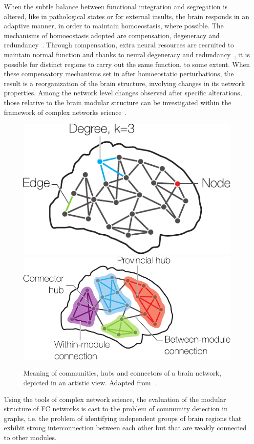 When the subtle balance between functional integration and segregation is altered, like in pathological states or for external insults, the brain responds in an adaptive manner, in order to maintain homoeostasis, where possible. The mechanisms of homoeostasis adopted are compensation, degeneracy and redundancy~\cite{fornito2015}.
Through compensation, extra neural resources are recruited to maintain normal function and thanks to neural degeneracy and redundancy~\cite{tononi1999}, it is possible for distinct regions to carry out the same function, to some extent.
When these compensatory mechanisms set in after homoeostatic perturbations, the result is a reorganization of the brain structure, involving changes in its network properties.
Among the network level changes observed after specific alterations, those relative to the brain modular structure can be investigated within the framework of complex networks science~\cite{alexander-bloch2010,alexander-bloch2012,meunier2009}.

\begin{figure}[htb!]
\centering
\hfill\includegraphics[height=0.25\textwidth]{images/brain_network_basics.pdf}\hfill
\includegraphics[height=0.25\textwidth]{images/brain_network_communities.pdf}\hfill
\caption{Meaning of communities, hubs and connectors of a brain network, depicted in an artistic view. Adapted from~\cite{sporns2016}.}
\label{fig:brain_network_communities}
\end{figure}


Using the tools of complex network science, the evaluation of the modular structure of FC networks is cast to the problem of community detection in graphs, i.e. the problem of identifying independent groups of brain regions that exhibit strong interconnection between each other but that are weakly connected to other modules.

